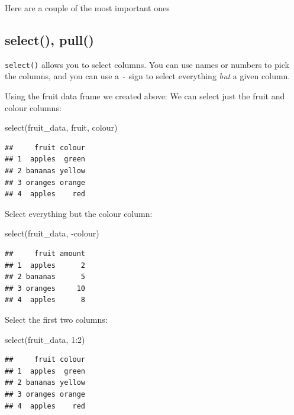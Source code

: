 \documentclass[
]{book}
\newenvironment{Shaded}{\begin{snugshade}}{\end{snugshade}}
\newcommand{\DecValTok}[1]{\textcolor[rgb]{0.00,0.00,0.81}{#1}}
\newcommand{\FunctionTok}[1]{\textcolor[rgb]{0.00,0.00,0.00}{#1}}
\newcommand{\NormalTok}[1]{#1}
\newcommand{\SpecialCharTok}[1]{\textcolor[rgb]{0.00,0.00,0.00}{#1}}
\begin{document}
Here are a couple of the most important ones

\hypertarget{select-pull}{%
\subsection{select(), pull()}\label{select-pull}}

\texttt{select()} allows you to select columns. You can use names or numbers to pick the columns, and you can use a \texttt{-} sign to select everything \emph{but} a given column.

Using the fruit data frame we created above: We can select just the fruit and colour columns:

\begin{Shaded}
\begin{Highlighting}[]
\FunctionTok{select}\NormalTok{(fruit\_data, fruit, colour)}
\end{Highlighting}
\end{Shaded}

\begin{verbatim}
##     fruit colour
## 1  apples  green
## 2 bananas yellow
## 3 oranges orange
## 4  apples    red
\end{verbatim}

Select everything but the colour column:

\begin{Shaded}
\begin{Highlighting}[]
\FunctionTok{select}\NormalTok{(fruit\_data, }\SpecialCharTok{{-}}\NormalTok{colour)}
\end{Highlighting}
\end{Shaded}

\begin{verbatim}
##     fruit amount
## 1  apples      2
## 2 bananas      5
## 3 oranges     10
## 4  apples      8
\end{verbatim}

Select the first two columns:

\begin{Shaded}
\begin{Highlighting}[]
\FunctionTok{select}\NormalTok{(fruit\_data, }\DecValTok{1}\SpecialCharTok{:}\DecValTok{2}\NormalTok{)}
\end{Highlighting}
\end{Shaded}

\begin{verbatim}
##     fruit colour
## 1  apples  green
## 2 bananas yellow
## 3 oranges orange
## 4  apples    red
\end{verbatim}
\end{document}
